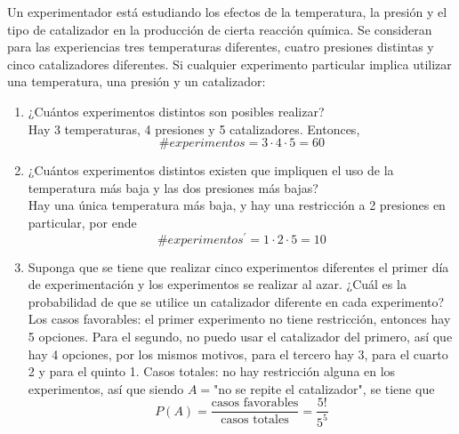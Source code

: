 \item Un experimentador está estudiando los efectos de la temperatura, la presión y el tipo de catalizador en la producción de cierta reacción química. Se consideran para las experiencias tres temperaturas diferentes, cuatro presiones distintas y cinco catalizadores diferentes. Si cualquier experimento particular implica utilizar una temperatura, una presión y un catalizador:
    \begin{enumerate}
        \item ¿Cuántos experimentos distintos son posibles realizar?\e\\
            Hay 3 temperaturas, 4 presiones y 5 catalizadores. Entonces,\[\#experimentos=3\cdot4\cdot5=60\]
        \item ¿Cuántos experimentos distintos existen que impliquen el uso de la temperatura más baja y las dos presiones más bajas?\e\\
            Hay una única temperatura más baja, y hay una restricción a 2 presiones en particular, por ende\[\#experimentos^\prime=1\cdot2\cdot5=10\]
        \item Suponga que se tiene que realizar cinco experimentos diferentes el primer día de experimentación y los experimentos se realizar al azar. ¿Cuál es la probabilidad de que se utilice un catalizador diferente en cada experimento?\e\\
            Los casos favorables: el primer experimento no tiene restricción, entonces hay 5 opciones. Para el segundo, no puedo usar el catalizador del primero, así que hay 4 opciones, por los mismos motivos, para el tercero hay 3, para el cuarto 2 y para el quinto 1. Casos totales: no hay restricción alguna en los experimentos, así que siendo $A=$"no se repite el catalizador", se tiene que\[P(A)=\frac{\text{casos favorables}}{\text{casos totales}}=\frac{5!}{5^5}\]
    \end{enumerate}